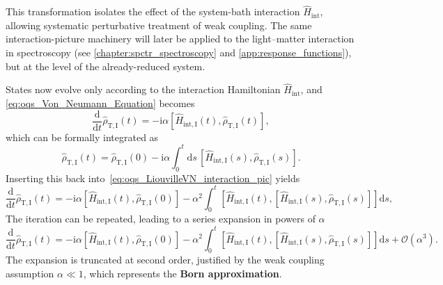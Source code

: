 This transformation isolates the effect of the system-bath interaction $\hat{H}_{\mathrm{int}}$, allowing systematic perturbative treatment of weak coupling. The same interaction-picture machinery will later be applied to the light--matter interaction in spectroscopy (see \autoref{chapter:spctr_spectroscopy} and \autoref{app:response_functions}), but at the level of the already-reduced system.

States now evolve only according to the interaction Hamiltonian $\hat{H}_{\mathrm{int}}$, and \autoref{eq:oqs_Von_Neumann_Equation} becomes
\begin{equation}
	\frac{\mathrm{d}}{\mathrm{d}t}\hat{\rho}_{\mathrm{T},\mathrm{I}}(t) = -\mathrm{i} \alpha [\hat{H}_{\mathrm{int},\mathrm{I}}(t), \hat{\rho}_{\mathrm{T},\mathrm{I}}(t)],
	\label{eq:oqs_LiouvilleVN_interaction_pic}
\end{equation}
which can be formally integrated as
\begin{equation*}
	\hat{\rho}_{\mathrm{T},\mathrm{I}}(t) = \hat{\rho}_{\mathrm{T},\mathrm{I}}(0) - \mathrm{i} \alpha \int_0^t\!\mathrm{d}s\,[\hat{H}_{\mathrm{int},\mathrm{I}}(s), \hat{\rho}_{\mathrm{T},\mathrm{I}}(s)].
\end{equation*}
Inserting this back into~\autoref{eq:oqs_LiouvilleVN_interaction_pic} yields
\begin{equation*}
	\frac{\mathrm{d}}{\mathrm{d}t}\hat{\rho}_{\mathrm{T},\mathrm{I}}(t) = -\mathrm{i} \alpha \left[ \hat{H}_{\mathrm{int},\mathrm{I}}(t), \hat{\rho}_{\mathrm{T},\mathrm{I}}(0) \right]
	- \alpha^2 \int_0^t \left[ \hat{H}_{\mathrm{int},\mathrm{I}}(t), \left[ \hat{H}_{\mathrm{int},\mathrm{I}}(s), \hat{\rho}_{\mathrm{T},\mathrm{I}}(s) \right] \right]\!\mathrm{d}s,
\end{equation*}
The iteration can be repeated, leading to a series expansion in powers of $\alpha$
\begin{equation}
	\frac{\mathrm{d}}{\mathrm{d}t}\hat{\rho}_{\mathrm{T},\mathrm{I}}(t) = -\mathrm{i} \alpha \left[ \hat{H}_{\mathrm{int},\mathrm{I}}(t), \hat{\rho}_{\mathrm{T},\mathrm{I}}(0) \right]
	- \alpha^2 \int_0^t \left[ \hat{H}_{\mathrm{int},\mathrm{I}}(t), \left[ \hat{H}_{\mathrm{int},\mathrm{I}}(s), \hat{\rho}_{\mathrm{T},\mathrm{I}}(s) \right] \right]\!\mathrm{d}s + \mathcal{O} (\alpha^3).
	\label{eq:oqs_Second_Order_Expansion_truncated}
\end{equation}
The expansion is truncated at second order, justified by the weak coupling assumption $\alpha \ll 1$, which represents the \textbf{Born approximation}.

